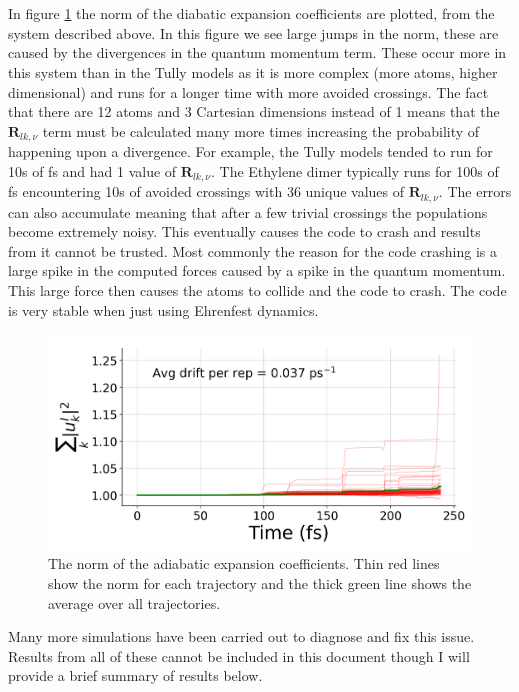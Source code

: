 \\\\
In figure \ref{fig:CP2K_norm} the norm of the diabatic expansion coefficients are plotted, from the system described above. In this figure we see large jumps in the norm, these are caused by the divergences in the quantum momentum term. These occur more in this system than in the Tully models as it is more complex (more atoms, higher dimensional) and runs for a longer time with more avoided crossings. The fact that there are 12 atoms and 3 Cartesian dimensions instead of 1 means that the $\mathbf{R}_{lk, \nu}$ term must be calculated many more times increasing the probability of happening upon a divergence. For example, the Tully models tended to run for 10s of fs and had 1 value of $\mathbf{R}_{lk, \nu}$. The Ethylene dimer typically runs for 100s of fs encountering 10s of avoided crossings with 36 unique values of $\mathbf{R}_{lk, \nu}$. The errors can also accumulate meaning that after a few trivial crossings the populations become extremely noisy. This eventually causes the code to crash and results from it cannot be trusted. Most commonly the reason for the code crashing is a large spike in the computed forces caused by a spike in the quantum momentum. This large force then causes the atoms to collide and the code to crash. The code is very stable when just using Ehrenfest dynamics.
\begin{figure}[ht]
  \includegraphics[width=\textwidth]{./img/CTMQC/Ethylene_norm.png}
  \caption{\label{fig:CP2K_norm}The norm of the adiabatic expansion coefficients. Thin red lines show the norm for each trajectory and the thick green line shows the average over all trajectories.}
\end{figure}
Many more simulations have been carried out to diagnose and fix this issue. Results from all of these cannot be included in this document though I will provide a brief summary of results below.
